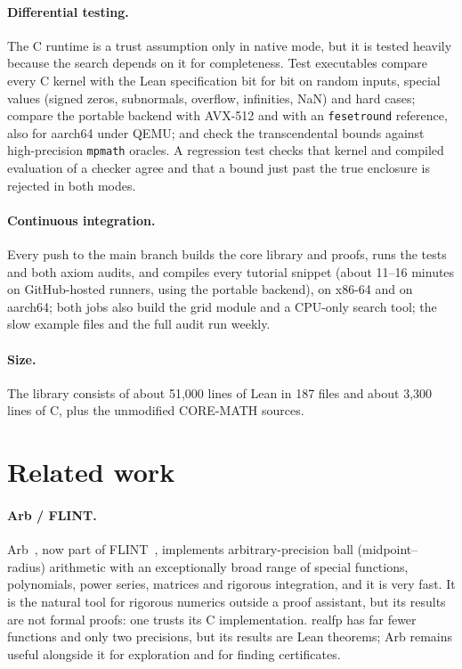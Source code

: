 \documentclass[11pt]{article}
\theoremstyle{definition}
\theoremstyle{remark}
\newcommand{\lean}[1]{\texttt{#1}}
\newcommand{\realfp}{\textsf{realfp}}
\begin{document}
\paragraph{Differential testing.} The C runtime is a trust assumption only
in native mode, but it is tested heavily because the search depends on it
for completeness. Test executables compare every C kernel with the Lean
specification bit for bit on random inputs, special values (signed zeros,
subnormals, overflow, infinities, NaN) and hard cases; compare the portable
backend with AVX-512 and with an \lean{fesetround} reference, also for
aarch64 under QEMU; and check the transcendental bounds against
high-precision \texttt{mpmath} oracles. A regression test checks that kernel
and compiled evaluation of a checker agree and that a bound just past the
true enclosure is rejected in both modes.

\paragraph{Continuous integration.} Every push to the main branch builds
the core library and proofs, runs the tests and both axiom audits, and
compiles every tutorial snippet (about 11--16 minutes on GitHub-hosted
runners, using the portable backend), on x86-64 and on aarch64; both jobs also
build the grid module and a CPU-only search tool; the slow example files and
the full audit run weekly.

\paragraph{Size.} The library consists of about 51{,}000 lines of Lean in
187 files and about 3{,}300 lines of C, plus the unmodified CORE-MATH
sources.

\section{Related work}\label{sec:related}

\paragraph{Arb / FLINT.} Arb~\cite{arb}, now part of FLINT~\cite{flint},
implements arbitrary-precision ball (midpoint--radius) arithmetic with an
exceptionally broad range of special functions, polynomials, power series,
matrices and rigorous integration, and it is very fast. It is the natural
tool for rigorous numerics outside a proof assistant, but its results are
not formal proofs: one trusts its C implementation. \realfp{} has far fewer
functions and only two precisions, but its results are Lean theorems; Arb
remains useful alongside it for exploration and for finding certificates.
\end{document}
